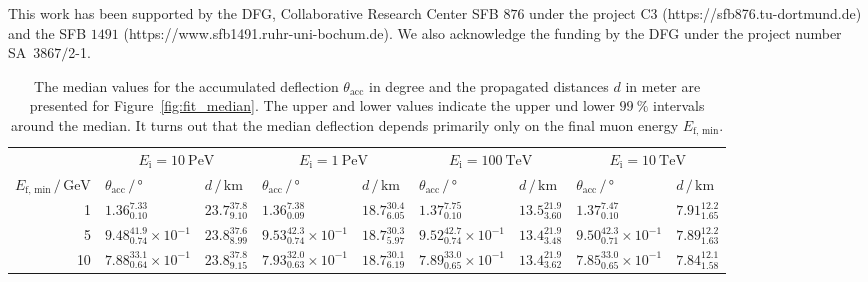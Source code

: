 \begin{acknowledgement}
  This work has been supported by the DFG, Collaborative Research Center SFB $876$
  under the project C3 
  (https://sfb876.tu-dortmund.de) and the SFB $1491$ (https://www.sfb1491.ruhr-uni-bochum.de).
  We also acknowledge the funding by the DFG under the project number SA~$3867/$2-1.
\end{acknowledgement}

\begin{table*}
    \centering
    \caption{The median values for the accumulated deflection $\theta_{\mathrm{acc}}$ in degree and the propagated distances 
    $d$ in meter are presented for Figure~\ref{fig:fit_median}. The upper and lower values indicate the upper und lower 
    $\SI{99}{\percent}$ intervals around the median. It turns out that the median deflection depends primarily 
    only on the final muon energy $E_{\mathrm{f,\,min}}$.}
    \label{tab:final_values}       %
    \begin{tabular}{r|ll|ll|ll|ll}
    \hline\noalign{\smallskip}
    & \multicolumn{2}{c|}{$E_{\mathrm{i}} = \SI{10}{\peta\electronvolt}$} & \multicolumn{2}{c|}{$E_{\mathrm{i}} = \SI{1}{\peta\electronvolt}$} 
    & \multicolumn{2}{c|}{$E_{\mathrm{i}} = \SI{100}{\tera\electronvolt}$} & \multicolumn{2}{c}{$E_{\mathrm{i}} = \SI{10}{\tera\electronvolt}$} \\
    $E_{\mathrm{f,\,min}}\,/\,\si{\giga\electronvolt}$ & $\theta_{\text{acc}}\,/\,\si{\degree}$ & $d\,/\,\si{\kilo\meter}$  
    & $\theta_{\text{acc}}\,/\,\si{\degree}$ & $d\,/\,\si{\kilo\meter}$ 
    & $\theta_{\text{acc}}\,/\,\si{\degree}$ & $d\,/\,\si{\kilo\meter}$
    & $\theta_{\text{acc}}\,/\,\si{\degree}$ & $d\,/\,\si{\kilo\meter}$\\
    \noalign{\smallskip}\hline\noalign{\smallskip}
    \rule{0pt}{2.6ex}\num{1}        & $1.36_{0.10}^{7.33}$ & $23.7_{9.10}^{37.8}$ & $1.36_{0.09}^{7.38}$ & $18.7_{6.05}^{30.4}$ & $1.37_{0.10}^{7.75}$ & $13.5_{3.60}^{21.9}$ & $1.37_{0.10}^{7.47}$ & $7.91_{1.65}^{12.2}$ \\
    \rule{0pt}{2.6ex}\num{5}        & $9.48_{0.74}^{41.9}\times 10^{-1}$ & $23.8_{8.99}^{37.6}$ & $9.53_{0.74}^{42.3}\times 10^{-1}$ & $18.7_{5.97}^{30.3}$ & $9.52_{0.74}^{42.7}\times 10^{-1}$ & $13.4_{3.48}^{21.9}$ & $9.50_{0.71}^{42.3}\times 10^{-1}$ & $7.89_{1.63}^{12.2}$ \\
    \rule{0pt}{2.6ex}\num{10}       & $7.88_{0.64}^{33.1}\times 10^{-1}$ & $23.8_{9.15}^{37.8}$ & $7.93_{0.63}^{32.0}\times 10^{-1}$ & $18.7_{6.19}^{30.1}$ & $7.89_{0.65}^{33.0}\times 10^{-1}$ & $13.4_{3.62}^{21.9}$ & $7.85_{0.65}^{33.0}\times 10^{-1}$ & $7.84_{1.58}^{12.1}$ \\

\end{tabular}
\end{table*}
